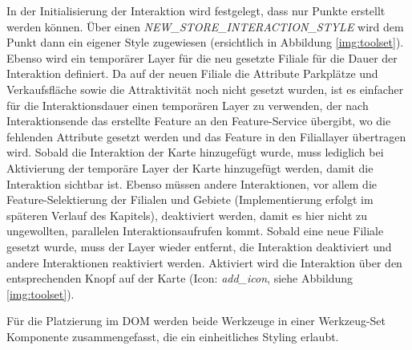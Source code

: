 In der Initialisierung der Interaktion wird festgelegt, dass nur Punkte erstellt werden können.
Über einen \emph{NEW\_STORE\_INTERACTION\_STYLE} wird dem Punkt dann ein eigener Style zugewiesen (ersichtlich in Abbildung \ref{img:toolset}).
Ebenso wird ein temporärer Layer für die neu gesetzte Filiale für die Dauer der Interaktion definiert.
Da auf der neuen Filiale die Attribute Parkplätze und Verkaufsfläche sowie die Attraktivität noch nicht gesetzt wurden, ist es einfacher für die Interaktionsdauer einen temporären Layer zu verwenden, der nach Interaktionsende das erstellte Feature an den Feature-Service übergibt, wo die fehlenden Attribute gesetzt werden und das Feature in den Filiallayer übertragen wird. 
Sobald die Interaktion der Karte hinzugefügt wurde, muss lediglich bei Aktivierung der temporäre Layer der Karte hinzugefügt werden, damit die Interaktion sichtbar ist.
Ebenso müssen andere Interaktionen, vor allem die Feature-Selektierung der Filialen und Gebiete (Implementierung erfolgt im späteren Verlauf des Kapitels), deaktiviert werden, damit es hier nicht zu ungewollten, parallelen Interaktionsaufrufen kommt.
Sobald eine neue Filiale gesetzt wurde, muss der Layer wieder entfernt, die Interaktion deaktiviert und andere Interaktionen reaktiviert werden.
Aktiviert wird die Interaktion über den entsprechenden Knopf auf der Karte (Icon: \emph{add\_icon}, siehe Abbildung \ref{img:toolset}).

Für die Platzierung im DOM werden beide Werkzeuge in einer Werkzeug-Set Komponente zusammengefasst, die ein einheitliches Styling erlaubt.

